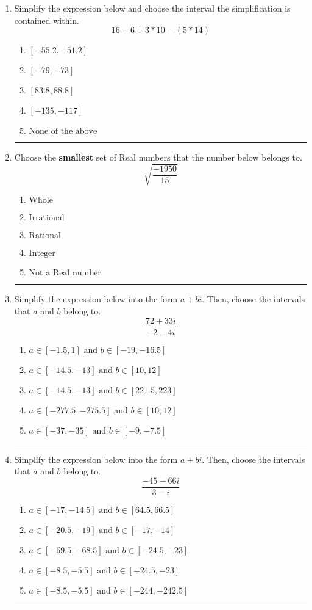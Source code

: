 \documentclass[14pt]{extbook}
\newcommand{\litem}[1]{\item#1\hspace*{-1cm}\rule{\textwidth}{0.4pt}}
\begin{document}
\begin{enumerate}
{\begin{enumerate}[label=\Alph*.]
\end{enumerate} }
\litem{
Simplify the expression below and choose the interval the simplification is contained within.\[ 16 - 6 \div 3 * 10 - (5 * 14) \]\begin{enumerate}[label=\Alph*.]
\item \( [-55.2, -51.2] \)
\item \( [-79, -73] \)
\item \( [83.8, 88.8] \)
\item \( [-135, -117] \)
\item \( \text{None of the above} \)

\end{enumerate} }
\litem{
Choose the \textbf{smallest} set of Real numbers that the number below belongs to.\[ \sqrt{\frac{-1950}{15}} \]\begin{enumerate}[label=\Alph*.]
\item \( \text{Whole} \)
\item \( \text{Irrational} \)
\item \( \text{Rational} \)
\item \( \text{Integer} \)
\item \( \text{Not a Real number} \)

\end{enumerate} }
\litem{
Simplify the expression below into the form $a+bi$. Then, choose the intervals that $a$ and $b$ belong to.\[ \frac{72 + 33 i}{-2 - 4 i} \]\begin{enumerate}[label=\Alph*.]
\item \( a \in [-1.5, 1] \text{ and } b \in [-19, -16.5] \)
\item \( a \in [-14.5, -13] \text{ and } b \in [10, 12] \)
\item \( a \in [-14.5, -13] \text{ and } b \in [221.5, 223] \)
\item \( a \in [-277.5, -275.5] \text{ and } b \in [10, 12] \)
\item \( a \in [-37, -35] \text{ and } b \in [-9, -7.5] \)

\end{enumerate} }
\litem{
Simplify the expression below into the form $a+bi$. Then, choose the intervals that $a$ and $b$ belong to.\[ \frac{-45 - 66 i}{3 - i} \]\begin{enumerate}[label=\Alph*.]
\item \( a \in [-17, -14.5] \text{ and } b \in [64.5, 66.5] \)
\item \( a \in [-20.5, -19] \text{ and } b \in [-17, -14] \)
\item \( a \in [-69.5, -68.5] \text{ and } b \in [-24.5, -23] \)
\item \( a \in [-8.5, -5.5] \text{ and } b \in [-24.5, -23] \)
\item \( a \in [-8.5, -5.5] \text{ and } b \in [-244, -242.5] \)


\end{enumerate}}
\end{enumerate}
\end{document}
